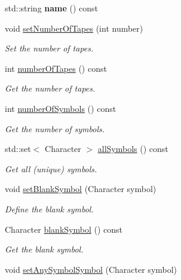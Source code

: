 \begin{DoxyCompactItemize}
\item 
\hypertarget{classtum_1_1_turing_machine_ae65ec50ed47357724a7f5a4d8dfa5a69}{std\-::string {\bfseries name} () const }\label{classtum_1_1_turing_machine_ae65ec50ed47357724a7f5a4d8dfa5a69}

\item 
void \hyperlink{classtum_1_1_turing_machine_ab3309e10f077e3bd3e4b61ca7dd0801c}{set\-Number\-Of\-Tapes} (int number)
\begin{DoxyCompactList}\small\item\em \-Set the number of tapes. \end{DoxyCompactList}\item 
int \hyperlink{classtum_1_1_turing_machine_a12f0145b627a9c2dbd26eaaa0c6f2eae}{number\-Of\-Tapes} () const 
\begin{DoxyCompactList}\small\item\em \-Get the number of tapes. \end{DoxyCompactList}\item 
int \hyperlink{classtum_1_1_turing_machine_a87de3c3e62cc1ced8cc0bf066e92d027}{number\-Of\-Symbols} () const 
\begin{DoxyCompactList}\small\item\em \-Get the number of symbols. \end{DoxyCompactList}\item 
std\-::set$<$ \-Character $>$ \hyperlink{classtum_1_1_turing_machine_a4b0d543855c395a7d12058231479e73c}{all\-Symbols} () const 
\begin{DoxyCompactList}\small\item\em \-Get all (unique) symbols. \end{DoxyCompactList}\item 
void \hyperlink{classtum_1_1_turing_machine_a3a328116d185aefee897b8fd43282b59}{set\-Blank\-Symbol} (\-Character symbol)
\begin{DoxyCompactList}\small\item\em \-Define the blank symbol. \end{DoxyCompactList}\item 
\-Character \hyperlink{classtum_1_1_turing_machine_af9be9d06ad32d7d740c698c98671dc31}{blank\-Symbol} () const 
\begin{DoxyCompactList}\small\item\em \-Get the blank symbol. \end{DoxyCompactList}\item 
void \hyperlink{classtum_1_1_turing_machine_acdfc43483f33b616b740a60a2444dc71}{set\-Any\-Symbol\-Symbol} (\-Character symbol)

\end{DoxyCompactItemize}
